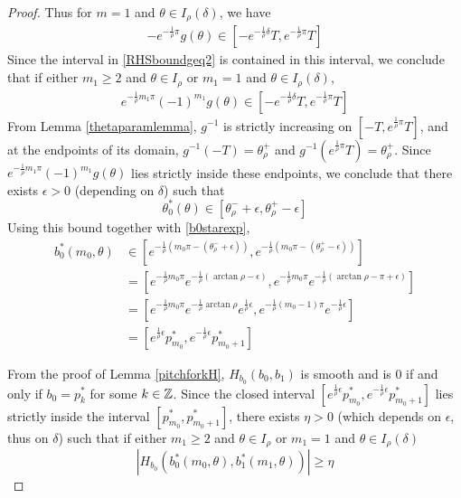 \documentclass[thesis.tex]{subfiles}
\begin{document}
\begin{lemma}
\begin{proof}
Thus for $m = 1$ and $\theta \in I_\rho(\delta)$, we have
\begin{align*}
-e^{ -\frac{1}{\rho} \pi } g(\theta)
\in [-e^{-\frac{1}{\rho}\delta} T, e^{ -\frac{1}{\rho} \pi } T]
\end{align*}
Since the interval in \eqref{RHSboundgeq2} is contained in this interval, we conclude that if either $m_1 \geq 2$ and $\theta \in I_\rho$ or $m_1 = 1$ and $\theta \in I_\rho(\delta)$,
\begin{align}\label{RHSbound2}
e^{ -\frac{1}{\rho} m_1 \pi } (-1)^{m_1} g(\theta) \in [-e^{-\frac{1}{\rho}\delta} T, e^{ -\frac{1}{\rho} \pi } T]
\end{align}
From Lemma \ref{thetaparamlemma}, $g^{-1}$ is strictly increasing on $[-T,e^{\frac{1}{\rho}\pi}T]$, and at the endpoints of its domain, $g^{-1}(-T) = \theta_\rho^+$ and $g^{-1}(e^{\frac{1}{\rho}\pi}T) = \theta_\rho^+$. Since $e^{-\frac{1}{\rho} m_1 \pi } (-1)^{m_1} g(\theta)$ lies strictly inside these endpoints, we conclude that there exists $\epsilon > 0$ (depending on $\delta$) such that 
\begin{equation}\label{thetastarboundeps}
\theta_0^*(\theta) \in [\theta_\rho^- + \epsilon, \theta_\rho^+ - \epsilon]
\end{equation}
Using this bound together with \eqref{b0starexp},
\begin{align*}
b_0^*(m_0, \theta) 
&\in \left[e^{-\frac{1}{\rho}(m_0 \pi - (\theta_\rho^- + \epsilon)) }, e^{-\frac{1}{\rho}(m_0 \pi - (\theta_\rho^+ - \epsilon)) }\right] \\
&= \left[ e^{-\frac{1}{\rho} m_0 \pi} e^{-\frac{1}{\rho} (\arctan \rho - \epsilon)}, e^{-\frac{1}{\rho} m_0 \pi} e^{-\frac{1}{\rho} (\arctan \rho - \pi + \epsilon)}\right] \\
&= \left[ e^{-\frac{1}{\rho} m_0 \pi} e^{-\frac{1}{\rho} \arctan \rho} e^{\frac{1}{\rho}\epsilon}, e^{-\frac{1}{\rho} (m_0-1) \pi} e^{-\frac{1}{\rho} \epsilon}\right] \\
&= \left[ e^{\frac{1}{\rho}\epsilon} p_{m_0}^*, e^{-\frac{1}{\rho} \epsilon} p_{m_0 + 1}^* \right]
\end{align*}

From the proof of Lemma \ref{pitchforkH}, $H_{b_0}(b_0, b_1)$ is smooth and is 0 if and only if $b_0 = p_k^*$ for some $k \in {\mathbb Z}$. Since the closed interval $\left[ e^{\frac{1}{\rho}\epsilon} p_{m_0}^*, e^{-\frac{1}{\rho} \epsilon} p_{m_0 + 1}^* \right]$ lies strictly inside the interval $[p_{m_0}^*, p_{m_0+1}^*]$, there exists $\eta > 0$ (which depends on $\epsilon$, thus on $\delta$) such that if either $m_1 \geq 2$ and $\theta \in I_\rho$ or $m_1 = 1$ and $\theta \in I_\rho(\delta)$
\[
|H_{b_0} (b_0^*(m_0, \theta), b_1^*(m_1, \theta))| \geq \eta
\]
\end{proof}
\end{lemma}
\end{document}

